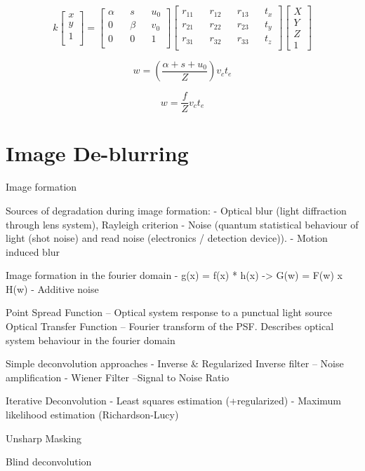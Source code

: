 \begin{equation}
\label{eq:camera_projection}
k
\begin{bmatrix}
x \\
y \\
1 \\
\end{bmatrix}
=
\begin{bmatrix}
\alpha && s && u_0 \\
0 && \beta && v_0 \\
0 && 0 && 1 \\
\end{bmatrix}
\begin{bmatrix}
r_{11} && r_{12} && r_{13} && t_x \\
r_{21} && r_{22} && r_{23} && t_y \\
r_{31} && r_{32} && r_{33} && t_z \\
\end{bmatrix}
\begin{bmatrix}
X \\
Y \\
Z \\
1
\end{bmatrix}
\end{equation}


\begin{equation}
\label{eq:blur_width_full}
w = \left( \frac{\alpha + s + u_0}{Z} \right) v_c t_e
\end{equation}


\begin{equation}
\label{eq:blur_width_simple}
w = \frac{f}{Z} v_c t_e
\end{equation}


\section{Image De-blurring}

Image formation

Sources of degradation during image formation:
 - Optical blur (light diffraction through lens system), Rayleigh criterion
 - Noise (quantum statistical behaviour of light (shot noise) and read noise (electronics / detection device)).
 - Motion induced blur

Image formation in the fourier domain
 - g(x) = f(x) * h(x) -> G(w) = F(w) x H(w)
 - Additive noise

Point Spread Function – Optical system response to a punctual light source
Optical Transfer Function – Fourier transform of the PSF. Describes optical system behaviour in the fourier domain

Simple deconvolution approaches
 - Inverse \& Regularized Inverse filter
 -- Noise amplification
 - Wiener Filter
 --Signal to Noise Ratio

Iterative Deconvolution
 - Least squares estimation (+regularized)
 - Maximum likelihood estimation (Richardson-Lucy)

Unsharp Masking

Blind deconvolution

